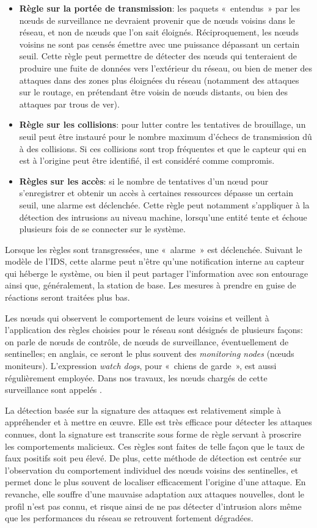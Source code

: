 \begin{itemize}
    \item \textbf{Règle sur la portée de transmission}: les paquets « entendus » par les nœuds de surveillance ne devraient provenir que de nœuds voisins dans le réseau, et non de nœuds que l'on sait éloignés. Réciproquement, les nœuds voisins ne sont pas censés émettre avec une puissance dépassant un certain seuil. Cette règle peut permettre de détecter des nœuds qui tenteraient de produire une fuite de données vers l'extérieur du réseau, ou bien de mener des attaques dans des zones plus éloignées du réseau (notamment des attaques sur le routage, en prétendant être voisin de nœuds distants, ou bien des attaques par trous de ver).
    \item \textbf{Règle sur les collisions}: pour lutter contre les tentatives de brouillage, un seuil peut être instauré pour le nombre maximum d'échecs de transmission dû à des collisions. Si ces collisions sont trop fréquentes et que le capteur qui en est à l'origine peut être identifié, il est considéré comme compromis.
    \item \textbf{Règles sur les accès}: si le nombre de tentatives d'un nœud pour s'enregistrer et obtenir un accès à certaines ressources dépasse un certain seuil, une alarme est déclenchée. Cette règle peut notamment s'appliquer à la détection des intrusions au niveau machine, lorsqu'une entité tente et échoue plusieurs fois de se connecter sur le système.
\end{itemize}

Lorsque les règles sont transgressées, une « alarme » est déclenchée.
Suivant le modèle de l'IDS, cette alarme peut n'être qu'une notification interne au capteur qui héberge le système, ou bien il peut partager l'information avec son entourage ainsi que, généralement, la station de base.
Les mesures à prendre en guise de réactions seront traitées plus bas.

Les nœuds qui observent le comportement de leurs voisins et veillent à l'application des règles choisies pour le réseau sont désignés de plusieurs façons: on parle de nœuds de contrôle, de nœuds de surveillance, éventuellement de sentinelles; en anglais, ce seront le plus souvent des \textit{monitoring nodes} (nœuds moniteurs).
L'expression \textit{watch dogs}, pour « chiens de garde », est aussi régulièrement employée.
Dans nos travaux, les nœuds chargés de cette surveillance sont appelés \cns.

La détection basée sur la signature des attaques est relativement simple à appréhender et à mettre en œuvre.
Elle est très efficace pour détecter les attaques connues, dont la signature est transcrite sous forme de règle servant à proscrire les comportements malicieux.
Ces règles sont faites de telle façon que le taux de faux positifs soit peu élevé.
De plus, cette méthode de détection est centrée sur l'observation du comportement individuel des nœuds voisins des sentinelles, et permet donc le plus souvent de localiser efficacement l'origine d'une attaque.
En revanche, elle souffre d'une mauvaise adaptation aux attaques nouvelles, dont le profil n'est pas connu, et risque ainsi de ne pas détecter d'intrusion alors même que les performances du réseau se retrouvent fortement dégradées.

